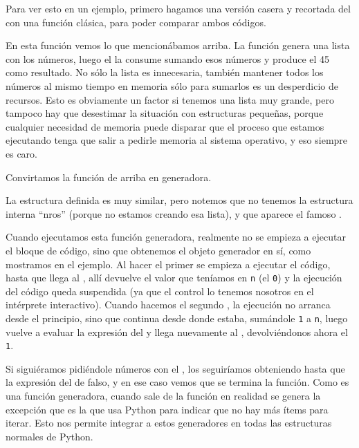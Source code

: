 Para ver esto en un ejemplo, primero hagamos una versión casera y recortada del  con una función clásica, para poder comparar ambos códigos.


En esta función vemos lo que mencionábamos arriba. La función genera una lista con los números, luego el  la consume sumando esos números y produce el 45 como resultado. No sólo la lista es innecesaria, también mantener todos los números al mismo tiempo en memoria sólo para sumarlos es un desperdicio de recursos. Esto es obviamente un factor si tenemos una lista muy grande, pero tampoco hay que desestimar la situación con estructuras pequeñas, porque cualquier necesidad de memoria puede disparar que el proceso que estamos ejecutando tenga que salir a pedirle memoria al sistema operativo, y eso siempre es caro.

Convirtamos la función de arriba en generadora.


La estructura definida es muy similar, pero notemos que no tenemos la estructura interna ``nros'' (porque no estamos creando esa lista), y que aparece el famoso .

Cuando ejecutamos esta función generadora, realmente no se empieza a ejecutar el bloque de código, sino que obtenemos el objeto generador en sí, como mostramos en el ejemplo. Al hacer el primer  se empieza a ejecutar el código, hasta que llega al , allí devuelve el valor que teníamos en \verb|n| (el \verb|0|) y la ejecución del código queda suspendida (ya que el control lo tenemos nosotros en el intérprete interactivo). Cuando hacemos el segundo , la ejecución no arranca desde el principio, sino que continua desde donde estaba, sumándole \verb|1| a \verb|n|, luego vuelve a evaluar la expresión del  y llega nuevamente al , devolviéndonos ahora el \verb|1|. 

Si siguiéramos pidiéndole números con el , los seguiríamos obteniendo hasta que la expresión del  de falso, y en ese caso vemos que se termina la función. Como es una función generadora, cuando sale de la función en realidad se genera la excepción  que es la que usa Python para indicar que no hay más ítems para iterar. Esto nos permite integrar a estos generadores en todas las estructuras normales de Python.

